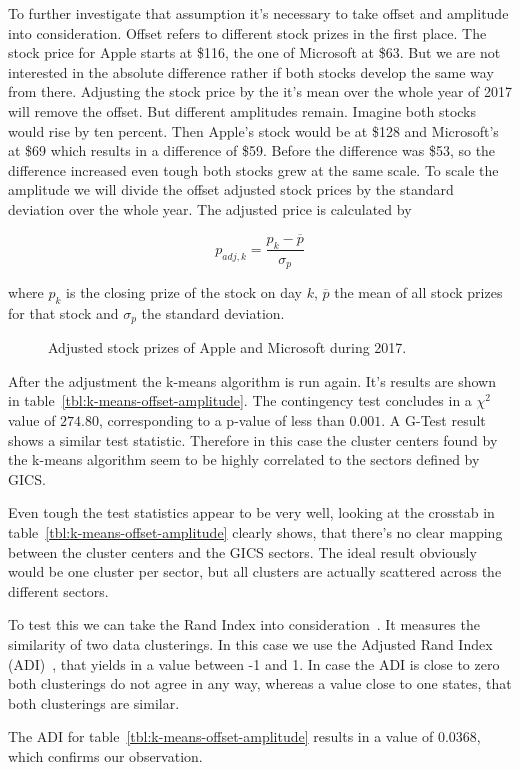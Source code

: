 To further investigate that assumption it's necessary to take offset and amplitude into consideration. Offset refers to different stock prizes in the first place. The stock price for Apple starts at \$116, the one of Microsoft at \$63. But we are not interested in the absolute difference rather if both stocks develop the same way from there. Adjusting the stock price by the it's mean over the whole year of 2017 will remove the offset. But different amplitudes remain. Imagine both stocks would rise by ten percent. Then Apple's stock would be at \$128 and Microsoft's at \$69 which results in a difference of \$59. Before the difference was \$53, so the difference increased even tough both stocks grew at the same scale. To scale the amplitude we will divide the offset adjusted stock prices by the standard deviation over the whole year. The adjusted price is calculated by 

\begin{equation}\label{eq:off-amp-adj}
	p_{adj, k} = \frac{p_k - \overline{p}}{\sigma_p}
\end{equation}

where $p_k$ is the closing prize of the stock on day $k$, $\overline{p}$ the mean of all stock prizes for that stock and $\sigma_p$ the standard deviation.

\begin{figure}\label{fig:appl-vs-msft_adj}
	\centering
	
	\caption{Adjusted stock prizes of Apple and Microsoft during 2017.}
\end{figure}

After the adjustment the k-means algorithm is run again. It's results are shown in table~\ref{tbl:k-means-offset-amplitude}. The contingency test concludes in a $\chi^2$ value of $274.80$, corresponding to a p-value of less than $0.001$. A G-Test result shows a similar test statistic. Therefore in this case the cluster centers found by the k-means algorithm seem to be highly correlated to the sectors defined by GICS.



Even tough the test statistics appear to be very well, looking at the crosstab in table~\ref{tbl:k-means-offset-amplitude} clearly shows, that there's no clear mapping between the cluster centers and the GICS sectors. The ideal result obviously would be one cluster per sector, but all clusters are actually scattered across the different sectors.

To test this we can take the Rand Index into consideration~\cite{rand1971objective}. It measures the similarity of two data clusterings. In this case we use the Adjusted Rand Index (ADI)~\cite{hubert1985comparing}, that yields in a value between -1 and 1. In case the ADI is close to zero both clusterings do not agree in any way, whereas a value close to one states, that both clusterings are similar.

The ADI for table~\ref{tbl:k-means-offset-amplitude} results in a value of 0.0368, which confirms our observation.



